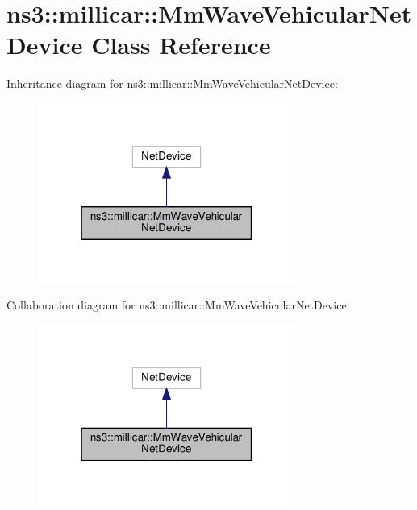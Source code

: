 \hypertarget{classns3_1_1millicar_1_1MmWaveVehicularNetDevice}{}\section{ns3\+:\+:millicar\+:\+:Mm\+Wave\+Vehicular\+Net\+Device Class Reference}
\label{classns3_1_1millicar_1_1MmWaveVehicularNetDevice}


Inheritance diagram for ns3\+:\+:millicar\+:\+:Mm\+Wave\+Vehicular\+Net\+Device\+:
\nopagebreak
\begin{figure}[H]
\begin{center}
\leavevmode
\includegraphics[width=238pt]{classns3_1_1millicar_1_1MmWaveVehicularNetDevice__inherit__graph}
\end{center}
\end{figure}


Collaboration diagram for ns3\+:\+:millicar\+:\+:Mm\+Wave\+Vehicular\+Net\+Device\+:
\nopagebreak
\begin{figure}[H]
\begin{center}
\leavevmode
\includegraphics[width=238pt]{classns3_1_1millicar_1_1MmWaveVehicularNetDevice__coll__graph}
\end{center}
\end{figure}
